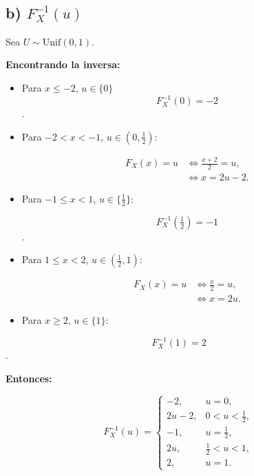 \documentclass[10pt,a4paper]{article}
\begin{document}
    \begin{center}
    \end{center}
    { \hspace*{\fill} \\}
    
    \hypertarget{b-grafica-de-f_x-1u}{%
\subsection{\texorpdfstring{b) 
\(F_{X}^{-1}(u)\)}{b) F\_\{X\}\^{}\{-1\}(u)}}\label{b-grafica-de-f_x-1u}}

    Sea \textbf{\(U\sim\mathrm{Unif}(0,1)\)}.

\textbf{Encontrando la inversa:}

\begin{itemize}
\item
  Para \(x\leq -2\), \(u\in\{0\}\) \[
  F_X^{-1}(0)=-2
  \].
\item
  Para \(-2<x<-1\), \(u\in(0,\tfrac12)\):

  \[
  \begin{aligned}
  F_X(x)=u &\iff \frac{x+2}{2}=u,\\
           &\iff x=2u-2.
  \end{aligned}
  \]
\item
  Para \(-1\leq x<1\), \(u\in\{\tfrac12\}\):

  \[
  F_X^{-1}(\tfrac12)=-1
  \].
\item
  Para \(1\leq x<2\), \(u\in(\tfrac12,1)\):

  \[
  \begin{aligned}
  F_X(x)=u &\iff \frac{x}{2}=u,\\
           &\iff x=2u.
  \end{aligned}
  \]
\item
  Para \(x\geq 2\), \(u\in\{1\}\):
\end{itemize}

\[
F_X^{-1}(1)=2
\].

\textbf{Entonces:}

\[
F_X^{-1}(u)=
\begin{cases}
-2,& u=0,\\[4pt]
2u-2,& 0<u<\tfrac12,\\[4pt]
-1,& u=\tfrac12,\\[4pt]
2u,& \tfrac12<u<1,\\[4pt]
2,& u=1.
\end{cases}
\]
\end{document}
